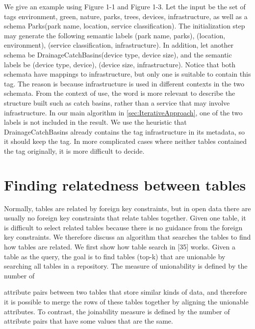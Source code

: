 We give an example using Figure 1-1 and Figure 1-3. Let the input be the set of tags {environment, green, nature, parks, trees, devices, infrastructure}, as well as a schema Parks(park name, location, service classification). The initialization step may generate the following semantic labels (park name, parks), (location, environment), (service classification, infrastructure). In addition, let another schema be DrainageCatchBasins(device type, device size), and the semantic labels be (device type, device), (device size, infrastructure).
Notice that both schemata have mappings to infrastructure, but only one is suitable to contain this tag. The reason is because infrastructure is used in different contexts in the two schemata. From the context of use, the word is more relevant to describe the structure built such as catch basins, rather than a service that may involve infrastructure. In our main algorithm in \autoref{sec:IterativeApproach}, one of the two labels is not included in the result. We use the heuristic that DrainageCatchBasins already contains the tag infrastructure in its metadata, so it should keep the tag. In more complicated cases where neither tables contained the tag originally, it is more difficult to decide.

\section{Finding relatedness between tables}
\label{sec:FindingRelatednessBetweenTables}

Normally, tables are related by foreign key constraints, but in open data there are usually no foreign key constraints that relate tables together. Given one table, it is difficult to select related tables because there is no guidance from the foreign key constraints. We therefore discuss an algorithm that searches the tables to find how tables are related. We first show how table search in \cite{Nargesian2018Table}[35] works. Given a table as the query, the goal is to find tables (top-k) that are unionable by searching all tables in a repository. The measure of unionability is defined by the number of

attribute pairs between two tables that store similar kinds of data, and therefore it is possible to merge the rows of these tables together by aligning the unionable attributes. To contrast, the joinability measure is defined by the number of attribute pairs that have some values that are the same.

